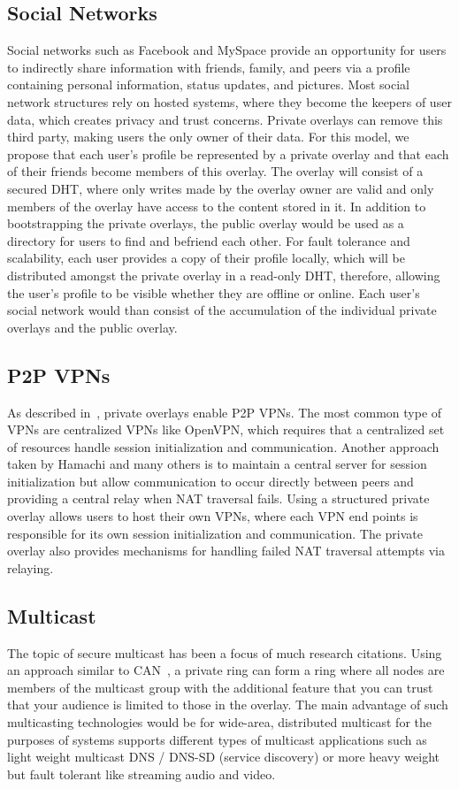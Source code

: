 \documentclass[conference]{IEEEtran}
\begin{document}
\subsection{Social Networks}
Social networks such as Facebook and MySpace provide an opportunity for users to
indirectly share information with friends, family, and peers via a profile
containing personal information, status updates, and pictures.
Most social network structures rely on hosted systems, where they become
the keepers of user data, which creates privacy and trust concerns.  Private overlays
can remove this third party, making users the only owner of their data.  For this
model, we propose that each user's profile be represented by a private overlay
and that each of their friends become members of this overlay.  The overlay will
consist of a secured DHT, where only writes made by the overlay owner are valid
and only members of the overlay have access to the content stored in it.  In
addition to bootstrapping the private overlays, the public overlay would be
used as a directory for users to find and befriend each other.  For fault
tolerance and scalability, each user provides a copy of their profile
locally, which will be distributed amongst the private overlay in a read-only
DHT, therefore, allowing the user's profile to be visible whether they are
offline or online.  Each user's social network would than consist of the
accumulation of the individual private overlays and the public overlay.

\subsection{P2P VPNs}
As described in~\cite{nsdi10}, private overlays enable P2P VPNs.  The most
common type of VPNs are centralized VPNs like OpenVPN, which requires that a
centralized set of resources handle session initialization and communication.
Another approach taken by Hamachi and many others is to maintain a central
server for session initialization but allow communication to occur directly
between peers and providing a central relay when NAT traversal fails.  Using
a structured private overlay allows users to host their own VPNs, where each
VPN end points is responsible for its own session initialization and
communication.  The private overlay also provides mechanisms for handling
failed NAT traversal attempts via relaying.

\subsection{Multicast}
The topic of secure multicast has been a focus of much research citations.
Using an approach similar to CAN~\cite{can_multicast}, a private ring can form
a ring where all nodes are members of the multicast group with the additional
feature that you can trust that your audience is limited to those in the
overlay.  The main advantage of such multicasting technologies would be for
wide-area, distributed multicast for the purposes of systems supports different
types of multicast applications such as light weight multicast DNS / DNS-SD
(service discovery) or more heavy weight but fault tolerant like streaming
audio and video.
\end{document}
